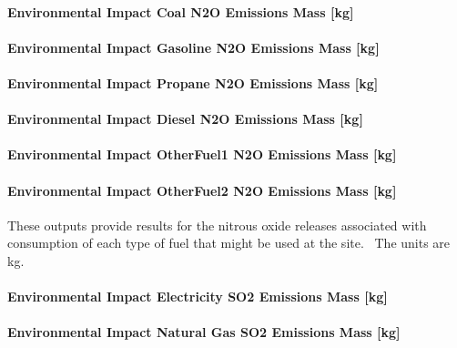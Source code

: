 \paragraph{Environmental Impact Coal N2O Emissions Mass {[}kg{]}}\label{environmental-impact-coal-n2o-emissions-mass-kg}

\paragraph{Environmental Impact Gasoline N2O Emissions Mass {[}kg{]}}\label{environmental-impact-gasoline-n2o-emissions-mass-kg}

\paragraph{Environmental Impact Propane N2O Emissions Mass {[}kg{]}}\label{environmental-impact-propane-n2o-emissions-mass-kg}

\paragraph{Environmental Impact Diesel N2O Emissions Mass {[}kg{]}}\label{environmental-impact-diesel-n2o-emissions-mass-kg}

\paragraph{Environmental Impact OtherFuel1 N2O Emissions Mass {[}kg{]}}\label{environmental-impact-otherfuel1-n2o-emissions-mass-kg}

\paragraph{Environmental Impact OtherFuel2 N2O Emissions Mass {[}kg{]}}\label{environmental-impact-otherfuel2-n2o-emissions-mass-kg}

These outputs provide results for the nitrous oxide releases associated with consumption of each type of fuel that might be used at the site.~ The units are kg.

\paragraph{Environmental Impact Electricity SO2 Emissions Mass {[}kg{]}}\label{environmental-impact-electricity-so2-emissions-mass-kg}

\paragraph{Environmental Impact Natural Gas SO2 Emissions Mass {[}kg{]}}\label{environmental-impact-natural-gas-so2-emissions-mass-kg}

